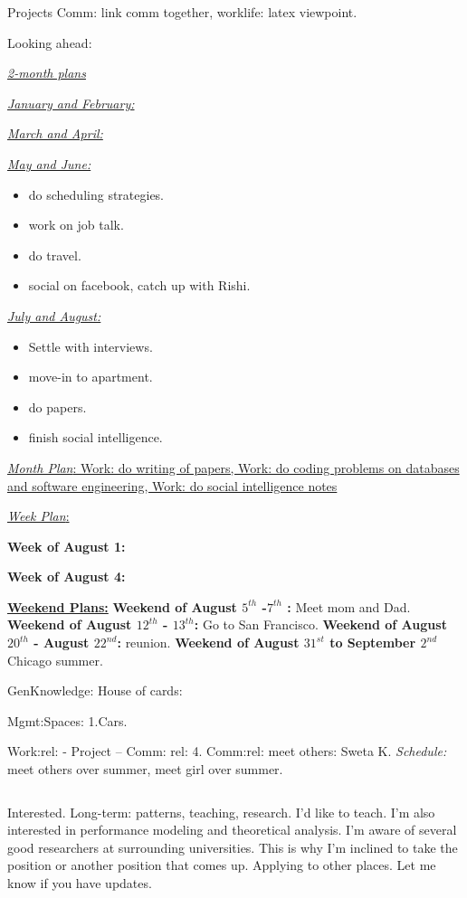 \documentclass[serif, mathserif, final]{beamer}
\begin{document}
\begin{frame}
\begin{columns}
\begin{block}{Projects}
Comm: link comm together, worklife: latex viewpoint. 

Looking ahead: 

\underline{\textit{2-month plans}}

\underline{\textit{January and February:}}

\underline{\textit{March and April:}} 

\underline{\textit{May and June:}}
\begin{itemize}
\tiny \item \tiny do scheduling strategies. 
\item \tiny work on job talk. 
\item \tiny do travel. 
\item \tiny social on facebook, catch up with Rishi. 
\end{itemize} 

\underline{\textit{July and August:}} 

\begin{itemize}
\tiny \item \tiny Settle with interviews. 
\item \tiny move-in to apartment.
\item \tiny do papers.
\item \tiny finish social intelligence.
\end{itemize} 

\underline{\textit{Month Plan}: Work: do writing of papers, Work: do
  coding problems on databases and software engineering, Work: do
  social intelligence notes} 

\underline{\textit{Week Plan}:} 

\textbf{Week of August 1: }  

\textbf{Week of August 4:} 

\underline{\textbf{Weekend Plans:}}
\textbf{Weekend of August $5^{th}$ -$7^{th}$ : } Meet mom and Dad.
\textbf{Weekend of August $12^{th}$ - $13^{th}$:} Go to San Francisco.
\textbf{Weekend of August $20^{th}$ - August $22^{nd}$:} reunion.
\textbf{Weekend of August $31^{st}$  to September $2^{nd}$ } Chicago
summer. 

GenKnowledge: 
House of cards: 

Mgmt:Spaces: 
1.Cars. 


Work:rel: -  Project – Comm: rel: 
4. Comm:rel: meet others:  Sweta K. 
{\it Schedule:} meet others over summer, meet girl over summer. 






\end{block}

\end{columns}
\end{frame} 
          Interested.
          Long-term: patterns, teaching, research. I'd like to teach. 
          I'm also interested in performance modeling and theoretical 
          analysis. I'm aware of several good researchers at 
          surrounding universities. This is why I'm inclined to take 
          the position or another position that comes up.
          Applying to other places. 
          Let me know if you have updates.
\end{document}

